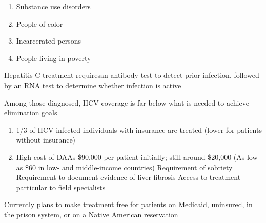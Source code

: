 \documentclass{notes}
\begin{document}
\begin{enumerate}
    \item Substance use disorders
    \item People of color
    \item Incarcerated persons
    \item People living in poverty
\end{enumerate}

Hepatitis C treatment requiresan antibody test to detect prior infection, followed by an RNA test to determine whether infection is active

Among those diagnosed, HCV coverage is far below what is needed to achieve elimination goals

\begin{enumerate}
    \item 1/3 of HCV-infected individuals with insurance are treated (lower for patients without insurance)
    \item High cost of DAAs
    \subitem \$90,000 per patient initially; still around \$20,000 (As low as \$60 in low- and middle-income countries)
    \subitem Requirement of sobriety
    \subitem Requirement to document evidence of liver fibrosis
    \subitem Access to treatment particular to field specialists
\end{enumerate}

Currently plans to make treatment free for patients on Medicaid, uninsured, in the prison system, or on a Native American reservation
\end{document}
